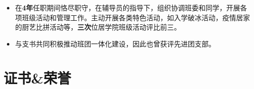 \documentclass{resume} %
\begin{document}
\begin{itemize}[parsep=0.5ex]
\item 在\textbf{4年}任职期间恪尽职守，在辅导员的指导下，组织协调班委和同学，开展各项班级活动和管理工作。主动开展各类特色活动，如入学破冰活动，疫情居家的厨艺比拼活动等，\textbf{三次}位居学院班级活动评比前三。
\item 与支书共同积极推动班团一体化建设，因此也曾获评先进团支部。
\end{itemize}

\section{证书\&荣誉}
\end{document}
